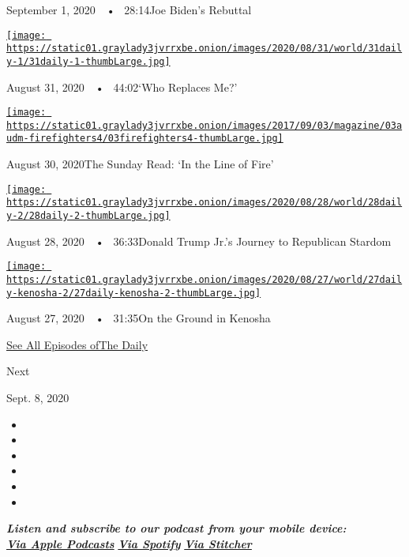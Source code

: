 September 1, 2020~~•~ 28:14Joe Biden's Rebuttal

\href{https://www.nytimes3xbfgragh.onion/2020/08/31/podcasts/the-daily/flint-michigan-police-officer.html?action=click\&module=audio-series-bar\&region=header\&pgtype=Article}{\texttt{[image: https://static01.graylady3jvrrxbe.onion/images/2020/08/31/world/31daily-1/31daily-1-thumbLarge.jpg]}}

August 31, 2020~~•~ 44:02`Who Replaces Me?'

\href{https://www.nytimes3xbfgragh.onion/2020/08/30/podcasts/the-daily/california-wildfires-prisoners.html?action=click\&module=audio-series-bar\&region=header\&pgtype=Article}{\texttt{[image: https://static01.graylady3jvrrxbe.onion/images/2017/09/03/magazine/03audm-firefighters4/03firefighters4-thumbLarge.jpg]}}

August 30, 2020The Sunday Read: `In the Line of Fire'

\href{https://www.nytimes3xbfgragh.onion/2020/08/28/podcasts/the-daily/donald-trump-junior-campaign.html?action=click\&module=audio-series-bar\&region=header\&pgtype=Article}{\texttt{[image: https://static01.graylady3jvrrxbe.onion/images/2020/08/28/world/28daily-2/28daily-2-thumbLarge.jpg]}}

August 28, 2020~~•~ 36:33Donald Trump Jr.'s Journey to Republican
Stardom

\href{https://www.nytimes3xbfgragh.onion/2020/08/27/podcasts/the-daily/kenosha-wisconsin-protests.html?action=click\&module=audio-series-bar\&region=header\&pgtype=Article}{\texttt{[image: https://static01.graylady3jvrrxbe.onion/images/2020/08/27/world/27daily-kenosha-2/27daily-kenosha-2-thumbLarge.jpg]}}

August 27, 2020~~•~ 31:35On the Ground in Kenosha

\href{https://www.nytimes3xbfgragh.onion/column/the-daily}{See All
Episodes ofThe Daily}

Next

Sept. 8, 2020

\begin{itemize}
\item
\item
\item
\item
\item
\item
\end{itemize}

\emph{\textbf{Listen and subscribe to our podcast from your mobile
device:}}\\
\textbf{\href{https://itunes.apple.com/us/podcast/the-daily/id1200361736?mt=2}{\emph{Via
Apple Podcasts}}} \emph{\textbf{\textbar{}}}
\textbf{\href{https://open.spotify.com/show/3IM0lmZxpFAY7CwMuv9H4g?si=SfuMSC55R1qprFsRZU3_zw}{\emph{Via
Spotify}}} \emph{\textbf{\textbar{}}}
\textbf{\href{http://www.stitcher.com/podcast/the-new-york-times/the-daily-10}{\emph{Via
Stitcher}}}

